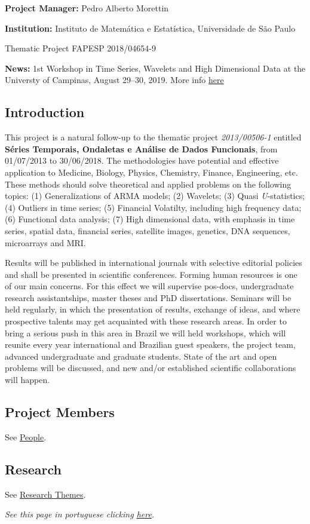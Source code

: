 \documentclass[]{article}
\date{}
\begin{document}
\textbf{Project Manager:} Pedro Alberto Morettin

\textbf{Institution:} Instituto de Matemática e Estatística,
Universidade de São Paulo

Thematic Project FAPESP 2018/04654-9

\textbf{News:} 1st Workshop in Time Series, Wavelets and High
Dimensional Data at the Universty of Campinas, August 29--30, 2019. More
info \href{workshop1.md}{here}

\subsection{Introduction}\label{introduction}

This project is a natural follow-up to the thematic project
\emph{2013/00506-1} entitled \textbf{Séries Temporais, Ondaletas e
Análise de Dados Funcionais}, from 01/07/2013 to 30/06/2018. The
methodologies have potential and effective application to Medicine,
Biology, Physics, Chemistry, Finance, Engineering, etc. These methods
should solve theoretical and applied problems on the following topics:
(1) Generalizations of ARMA models; (2) Wavelets; (3) Quasi
\emph{U}-statistics; (4) Outliers in time series; (5) Financial
Volatilty, including high frequency data; (6) Functional data analysis;
(7) High dimensional data, with emphasis in time series, spatial data,
financial series, satellite images, genetics, DNA sequences, microarrays
and MRI.

Results will be published in international journals with selective
editorial policies and shall be presented in scientific conferences.
Forming human resources is one of our main concerns. For this effect we
will supervise pos-docs, undergraduate research assistantships, master
theses and PhD dissertations. Seminars will be held regularly, in which
the presentation of results, exchange of ideas, and where prospective
talents may get acquainted with these research areas. In order to bring
a serious push in this area in Brazil we will held workshops, which will
reunite every year international and Brazilian guest speakers, the
project team, advanced undergraduate and graduate students. State of the
art and open problems will be discussed, and new and/or established
scientific collaborations will happen.

\subsection{Project Members}\label{project-members}

See \href{\%7B\%7B\%20site.people\%20\%7C\%20site.url\%7D\%7D}{People}.

\subsection{Research}\label{research}

See \href{\%7B\%7B\%20site.temas\%20\%7C\%20site.url\%7D\%7D}{Research
Themes}.

\emph{See this page in portuguese clicking \href{index_PORT.md}{here}.}
\end{document}
